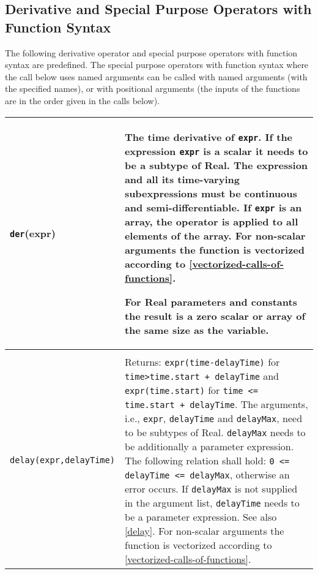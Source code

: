 \subsection{Derivative and Special Purpose Operators with Function Syntax}\label{derivative-and-special-purpose-operators-with-function-syntax}

The following derivative operator and special purpose operators with
function syntax are predefined. The special purpose operators with
function syntax where the call below uses named arguments can be called
with named arguments (with the specified names), or with positional
arguments (the inputs of the functions are in the order given in the
calls below).

\begin{longtable}{|p{5.1cm}|p{8cm}|}
\hline \endhead

\lstinline!der!(expr) &
The time derivative of \lstinline!expr!. If the expression \lstinline!expr! is a
scalar it needs to be a subtype of Real. The expression and all its
time-varying subexpressions must be continuous and semi-differentiable.
If \lstinline!expr! is an array, the operator
is applied to all elements of the array. For non-scalar arguments the
function is vectorized according to \cref{vectorized-calls-of-functions}.
\par
\begin{nonnormative*}
For Real parameters and constants the result is a zero scalar or array of the same size as the variable.
\end{nonnormative*}
\\
\hline

\begin{tabular}{@{}p{5.1cm}@{}}

\lstinline!delay(expr,delayTime,delayMax)!\\
\lstinline!delay(expr,delayTime)!
\end{tabular} &
Returns: \lstinline!expr(time-delayTime)! for \lstinline!time>time.start + delayTime! and \lstinline!expr(time.start)! for \lstinline!time <= time.start + delayTime!. The arguments, i.e., \lstinline!expr!, \lstinline!delayTime! and \lstinline!delayMax!, need to be
subtypes of Real. \lstinline!delayMax! needs to be additionally a parameter
expression. The following relation shall hold: \lstinline!0 <= delayTime <= delayMax!, otherwise an error occurs. If \lstinline!delayMax! is not
supplied in the argument list, \lstinline!delayTime! needs to be a parameter
expression. See also \cref{delay}. For non-scalar arguments the
function is vectorized according to \cref{vectorized-calls-of-functions}.\\
\hline


\end{longtable}
